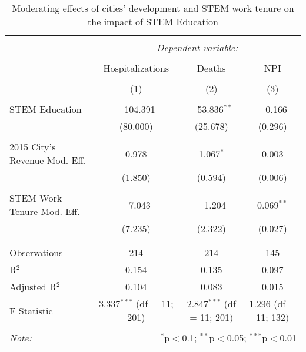 
\begin{table}[!htbp] \centering 
  \caption{Moderating effects of cities’ development and STEM work tenure on the impact of STEM Education} 
  \label{} 
\begin{tabular}{@{\extracolsep{5pt}}lccc} 
\\[-1.8ex]\hline 
\hline \\[-1.8ex] 
 & \multicolumn{3}{c}{\textit{Dependent variable:}} \\ 
\cline{2-4} 
\\[-1.8ex] & Hospitalizations & Deaths & NPI \\ 
\\[-1.8ex] & (1) & (2) & (3)\\ 
\hline \\[-1.8ex] 
 STEM Education & $-$104.391 & $-$53.836$^{**}$ & $-$0.166 \\ 
  & (80.000) & (25.678) & (0.296) \\ 
  & & & \\ 
 2015 City's Revenue Mod. Eff. & 0.978 & 1.067$^{*}$ & 0.003 \\ 
  & (1.850) & (0.594) & (0.006) \\ 
  & & & \\ 
 STEM Work Tenure Mod. Eff. & $-$7.043 & $-$1.204 & 0.069$^{**}$ \\ 
  & (7.235) & (2.322) & (0.027) \\ 
  & & & \\ 
\hline \\[-1.8ex] 
Observations & 214 & 214 & 145 \\ 
R$^{2}$ & 0.154 & 0.135 & 0.097 \\ 
Adjusted R$^{2}$ & 0.104 & 0.083 & 0.015 \\ 
F Statistic & 3.337$^{***}$ (df = 11; 201) & 2.847$^{***}$ (df = 11; 201) & 1.296 (df = 11; 132) \\ 
\hline 
\hline \\[-1.8ex] 
\textit{Note:}  & \multicolumn{3}{r}{$^{*}$p$<$0.1; $^{**}$p$<$0.05; $^{***}$p$<$0.01} \\ 
\end{tabular} 
\end{table} 
